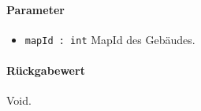 \paragraph*{Parameter}
\begin{itemize}
    \item \texttt{mapId : int} MapId des Gebäudes.
\end{itemize}
\paragraph*{Rückgabewert}
Void.
